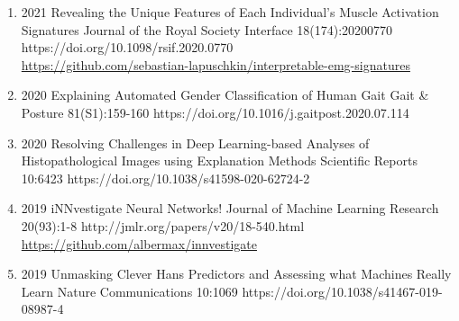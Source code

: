 \documentclass[10pt,a4paper]{article} %
\begin{document}
{\begin{enumerate}
    \item {}
                        {2021}
                        {Revealing the Unique Features of Each Individual's Muscle Activation Signatures}
                        {Journal of the Royal Society Interface}
                        {18(174):20200770}
                        {https://doi.org/10.1098/rsif.2020.0770}
                        {\\\href{https://github.com/sebastian-lapuschkin/interpretable-emg-signatures}{https://github.com/sebastian-lapuschkin/interpretable-emg-signatures}}

    \item {}
                        {2020}
                        {Explaining Automated Gender Classification of Human Gait}
                        {Gait \& Posture}
                        {81(S1):159-160}
                        {https://doi.org/10.1016/j.gaitpost.2020.07.114}

    \item {}
                        {2020}
                        {Resolving Challenges in Deep Learning-based Analyses of Histopathological Images using Explanation Methods}
                        {Scientific Reports}
                        {10:6423}
                        {https://doi.org/10.1038/s41598-020-62724-2}

    \item {}
                        {2019}
                        {iNNvestigate Neural Networks!}
                        {Journal of Machine Learning Research}
                        {20(93):1-8}
                        {http://jmlr.org/papers/v20/18-540.html}
                        {\href{https://github.com/albermax/innvestigate}{https://github.com/albermax/innvestigate}}

    \item {}
                        {2019}
                        {Unmasking Clever Hans Predictors and Assessing what Machines Really Learn}
                        {Nature Communications}
                        {10:1069}
                        {https://doi.org/10.1038/s41467-019-08987-4}


\end{enumerate}}
\end{document}
